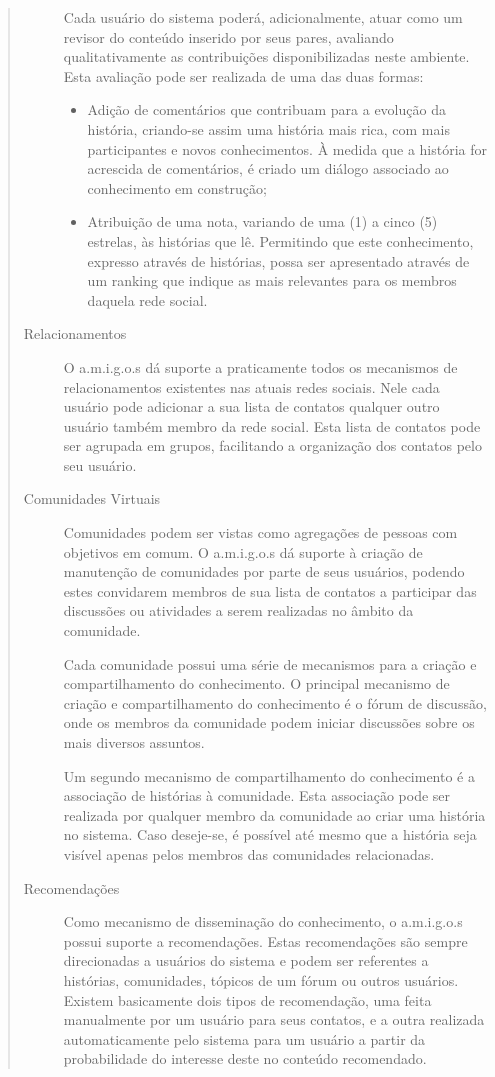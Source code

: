 \begin{quote}{\citep{RicardoAraujoCosta2008}}
\begin{description}
	Cada usuário do sistema poderá, adicionalmente, atuar como um revisor do
	conteúdo inserido por seus pares, avaliando qualitativamente as contribuições
	disponibilizadas neste ambiente. Esta avaliação pode ser realizada de uma das
	duas formas:
	\begin{itemize}
	  \item Adição de comentários que contribuam para a evolução da história,
	  criando-se assim uma história mais rica, com mais participantes e novos
	  conhecimentos. À medida que a história for acrescida de comentários, é criado
	  um diálogo associado ao conhecimento em construção;
	  \item Atribuição de uma nota, variando de uma (1) a cinco (5) estrelas, às
	  histórias que lê. Permitindo que este conhecimento, expresso através de
	  histórias, possa ser apresentado através de um ranking que indique as mais
	  relevantes para os membros daquela rede social.
	\end{itemize}
	\item[Relacionamentos] O a.m.i.g.o.s dá suporte a praticamente todos os
	mecanismos de relacionamentos existentes nas atuais redes sociais. Nele cada
	usuário pode adicionar a sua lista de contatos qualquer outro usuário também
	membro da rede social. Esta lista de contatos pode ser agrupada em grupos,
	facilitando a organização dos contatos pelo seu usuário.
	\item[Comunidades Virtuais] Comunidades podem ser vistas como agregações de
	pessoas com objetivos em comum. O a.m.i.g.o.s dá suporte à criação de
	manutenção de comunidades por parte de seus usuários, podendo estes convidarem
	membros de sua lista de contatos a participar das discussões ou atividades a
	serem realizadas no âmbito da comunidade.

	Cada comunidade possui uma série de mecanismos para a criação e
	compartilhamento do conhecimento. O principal mecanismo de criação e
	compartilhamento do conhecimento é o fórum de discussão, onde os membros da
	comunidade podem iniciar discussões sobre os mais diversos assuntos.

	Um segundo mecanismo de compartilhamento do conhecimento é a associação de
	histórias à comunidade. Esta associação pode ser realizada por qualquer membro
	da comunidade ao criar uma história no sistema. Caso deseje-se, é possível até
	mesmo que a história seja visível apenas pelos membros das comunidades
	relacionadas.
	\item[Recomendações] Como mecanismo de disseminação do conhecimento, o
	a.m.i.g.o.s possui suporte a recomendações. Estas recomendações são sempre
	direcionadas a usuários do sistema e podem ser referentes a histórias,
	comunidades, tópicos de um fórum ou outros usuários. Existem basicamente dois
	tipos de recomendação, uma feita manualmente por um usuário para seus
	contatos, e a outra realizada automaticamente pelo sistema para um usuário a
	partir da probabilidade do interesse deste no conteúdo recomendado.


\end{description}
\end{quote}
